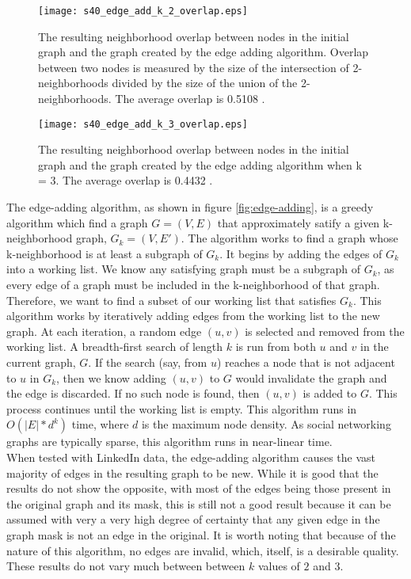 \begin{figure}[htb]
\texttt{[image: s40\_edge\_add\_k\_2\_overlap.eps]}
	\caption{The resulting neighborhood overlap between nodes in the initial graph and the graph created by the edge adding algorithm. Overlap between two nodes is measured by the size of the intersection of 2-neighborhoods divided by the size of the union of the 2-neighborhoods. The average overlap is 0.5108 . }
	\label{fig:edge-adding overlap k=2}
\end{figure}

\begin{figure}[htb]
\texttt{[image: s40\_edge\_add\_k\_3\_overlap.eps]}
	\caption{The resulting neighborhood overlap between nodes in the initial graph and the graph created by the edge adding algorithm when k = 3. The average overlap is 0.4432 . }
	\label{fig:edge-adding overlap k=3}
\end{figure}

\indent The edge-adding algorithm, as shown in figure \ref{fig:edge-adding}, is a greedy algorithm which find a graph $G = (V,E)$ that approximately satify a given k-neighborhood graph, $G_k = (V, E')$. The algorithm works to find a graph whose k-neighborhood is at least a subgraph of $G_k$. It begins by adding the edges of $G_k$ into a working list. We know any satisfying graph must be a subgraph of $G_k$, as every edge of a graph must be included in the k-neighborhood of that graph. Therefore, we want to find a subset of our working list that satisfies $G_k$. This algorithm works by iteratively adding edges from the working list to the new graph.  At each iteration, a random edge $(u,v)$ is selected and removed from the working list. A breadth-first search of length $k$ is run from both $u$ and $v$ in the current graph, $G$. If the search (say, from $u$) reaches a node that is not adjacent to $u$ in $G_k$, then we know adding $(u,v)$ to $G$ would invalidate the graph and the edge is discarded. If no such node is found, then $(u,v)$ is added to $G$. This process continues until the working list is empty. This algorithm runs in $O(|E|*d^k)$ time, where $d$ is the maximum node density. As social networking graphs are typically sparse, this algorithm runs in near-linear time. \\

\indent When tested with LinkedIn data, the edge-adding algorithm causes the vast majority of edges in the resulting graph to be new. While it is good that the results do not show the opposite, with most of the edges being those present in the original graph and its mask, this is still not a good result because it can be assumed with very a very high degree of certainty that any given edge in the graph mask is not an edge in the original. It is worth noting that because of the nature of this algorithm, no edges are invalid, which, itself, is a desirable quality. These results do not vary much between between $k$ values of $2$ and $3$. \\
